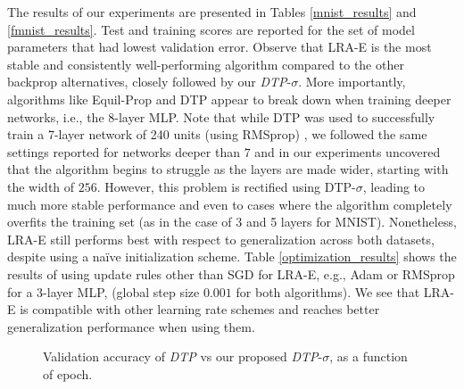 \documentclass[letterpaper]{article} %
\begin{document}
The results of our experiments are presented in Tables \ref{mnist_results} and \ref{fmnist_results}. Test and training scores are reported for the set of model parameters that had lowest validation error. Observe that LRA-E is the most stable and consistently well-performing algorithm compared to the other backprop alternatives, closely followed by our \emph{DTP}-$\sigma$. More importantly, algorithms like Equil-Prop and DTP appear to break down when training deeper networks, i.e., the 8-layer MLP. Note that while DTP was used to successfully train a 7-layer network of 240 units (using RMSprop) \cite{lee2015difference}, we followed the same settings reported for networks deeper than $7$ and in our experiments uncovered that the algorithm begins to struggle as the layers are made wider, starting with the width of $256$. However, this problem is rectified using DTP-$\sigma$, leading to much more stable performance and even to cases where the algorithm completely overfits the training set (as in the case of 3 and 5 layers for MNIST). Nonetheless, LRA-E still performs best with respect to generalization across both datasets, despite using a na\"ive initialization scheme. Table \ref{optimization_results} shows the results of using update rules other than SGD for LRA-E, e.g., Adam \cite{kingma2014adam} or RMSprop \cite{tieleman2012rmsprop} for a 3-layer MLP, (global step size $0.001$ for both algorithms). We see that LRA-E is compatible with other learning rate schemes and reaches better generalization performance when using them.

\begin{figure}[!t]
\centering     %
\caption{Validation accuracy of \emph{DTP} vs our proposed \emph{DTP}-$\sigma$, as a function of epoch.}
\label{fig:dtp_plots}
\end{figure}
\end{document}
